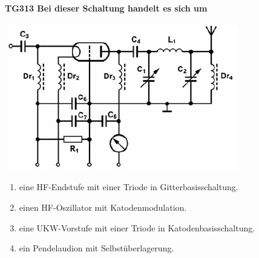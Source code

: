 \documentclass[8pt]{article}
\begin{document}
\paragraph*{TG313 Bei dieser Schaltung handelt es sich um} 
\begin{center}
	\begin{minipage}{\linewidth}
		\centering
		\includegraphics[scale=1.0]{pics/tg313_a.jpg}
	\end{minipage}
\end{center}
\begin{enumerate}[nolistsep,label=\Alph*]
\item eine HF-Endstufe mit einer Triode in Gitterbasisschaltung.
\item einen HF-Oszillator mit Katodenmodulation.
\item eine UKW-Vorstufe mit einer Triode in Katodenbasisschaltung.
\item ein Pendelaudion mit Selbstüberlagerung.
\end{enumerate}
\end{document}
